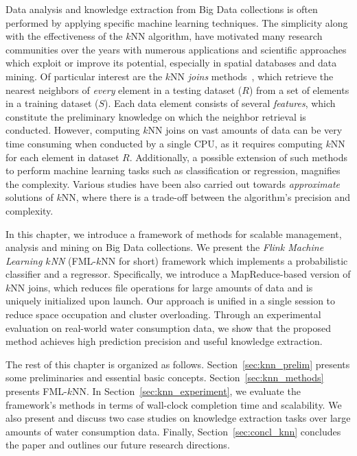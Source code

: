 Data analysis and knowledge extraction from Big Data collections is often performed by applying specific machine learning techniques. The simplicity along with the effectiveness of the $k$NN algorithm, have motivated many research communities over the years with numerous applications and scientific approaches which exploit or improve its potential, especially in spatial databases and data mining. Of particular interest are the $k$NN \textit{joins} methods~\cite{bohm2004knn}, which retrieve the nearest neighbors of \textit{every} element in a testing dataset ($R$) from a set of elements in a training dataset ($S$). Each data element consists of several \textit{features}, which constitute the preliminary knowledge on which the neighbor retrieval is conducted. However, computing $k$NN joins on vast amounts of data can be very time consuming when conducted by a single CPU, as it requires computing $k$NN for each element in dataset $R$. Additionally, a possible extension of such methods to perform machine learning tasks such as classification or regression, magnifies the complexity. Various studies have been also carried out towards \textit{approximate} solutions of $k$NN, where there is a trade-off between the algorithm's precision and complexity. 

In this chapter, we introduce a framework of methods for scalable management, analysis and mining on Big Data collections. We present the \textit{Flink Machine Learning $k$NN} (FML-$k$NN for short) framework which implements a probabilistic classifier and a regressor. Specifically, we introduce a MapReduce-based version of $k$NN joins, which reduces file operations for large amounts of data and is uniquely initialized upon launch. Our approach is unified in a single session to reduce space occupation and cluster overloading. Through an experimental evaluation on real-world water consumption data, we show that the proposed method achieves high prediction precision and useful knowledge extraction.

The rest of this chapter is organized as follows. Section~\ref{sec:knn_prelim} presents some preliminaries and essential basic concepts. Section~\ref{sec:knn_methods} presents FML-$k$NN. In Section~\ref{sec:knn_experiment}, we evaluate the framework's methods in terms of wall-clock completion time and scalability. We also present and discuss two case studies on knowledge extraction tasks over large amounts of water consumption data. Finally, Section~\ref{sec:concl_knn} concludes the paper and outlines our future research directions.